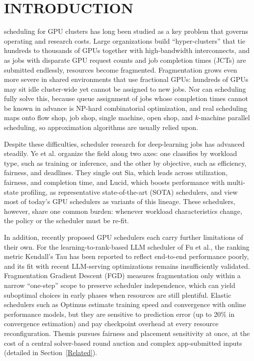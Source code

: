 \documentclass{ieeetj}
\begin{document}
\maketitle

\section{INTRODUCTION}\label{sec1}
 scheduling for GPU clusters has long been studied as a key problem that governs operating and research costs. Large organizations build ``hyper-clusters'' that tie hundreds to thousands of GPUs together with high-bandwidth interconnects, and as jobs with disparate GPU request counts and job completion times (JCTs) are submitted endlessly, resources become fragmented\cite{athlur2022varuna}. Fragmentation grows even more severe in shared environments that use fractional GPUs: hundreds of GPUs may sit idle cluster-wide yet cannot be assigned to new jobs\cite{weng2023beware}. Nor can scheduling fully solve this, because queue assignment of jobs whose completion times cannot be known in advance is NP-hard combinatorial optimization\cite{ullman1975np}, and real scheduling maps onto flow shop, job shop, single machine, open shop, and $k$-machine parallel scheduling\cite{b1}, so approximation algorithms are usually relied upon\cite{b2}.

Despite these difficulties, scheduler research for deep-learning jobs has advanced steadily. Ye et al.\cite{b3} organize the field along two axes: one classifies by workload type, such as training or inference, and the other by objective, such as efficiency, fairness, and deadlines. They single out Sia\cite{b4}, which leads across utilization, fairness, and completion time, and Lucid\cite{b5}, which boosts performance with multi-state profiling, as representative state-of-the-art (SOTA) schedulers, and view most of today's GPU schedulers as variants of this lineage. These schedulers, however, share one common burden: whenever workload characteristics change, the policy or the scheduler must be re-fit.

In addition, recently proposed GPU schedulers each carry further limitations of their own. For the learning-to-rank-based LLM scheduler of Fu et al.\cite{fu2024efficient}, the ranking metric Kendall's Tau has been reported to reflect end-to-end performance poorly, and its fit with recent LLM-serving optimizations remains insufficiently validated\cite{fu2024efficient}. Fragmentation Gradient Descent (FGD)\cite{weng2023beware} measures fragmentation only within a narrow ``one-step'' scope to preserve scheduler independence, which can yield suboptimal choices in early phases when resources are still plentiful. Elastic schedulers such as Optimus\cite{peng2018optimus} estimate training speed and convergence with online performance models, but they are sensitive to prediction error (up to 20\% in convergence estimation) and pay checkpoint overhead at every resource reconfiguration. Themis\cite{mahajan2020themis} pursues fairness and placement sensitivity at once, at the cost of a central solver-based round auction and complex app-submitted inputs (detailed in Section~\ref{Related}).
\end{document}
